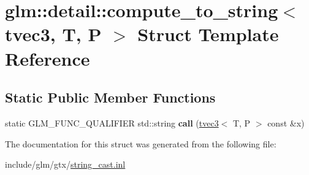 \hypertarget{structglm_1_1detail_1_1compute__to__string_3_01tvec3_00_01T_00_01P_01_4}{}\section{glm\+:\+:detail\+:\+:compute\+\_\+to\+\_\+string$<$ tvec3, T, P $>$ Struct Template Reference}
\label{structglm_1_1detail_1_1compute__to__string_3_01tvec3_00_01T_00_01P_01_4}
\subsection*{Static Public Member Functions}
\begin{DoxyCompactItemize}
\item 
\mbox{\label{structglm_1_1detail_1_1compute__to__string_3_01tvec3_00_01T_00_01P_01_4_acf3706c18e3084b171b0bcfe4ea64ffa}} 
static G\+L\+M\+\_\+\+F\+U\+N\+C\+\_\+\+Q\+U\+A\+L\+I\+F\+I\+ER std\+::string {\bfseries call} (\hyperlink{structglm_1_1tvec3}{tvec3}$<$ T, P $>$ const \&x)
\end{DoxyCompactItemize}


The documentation for this struct was generated from the following file\+:\begin{DoxyCompactItemize}
\item 
include/glm/gtx/\hyperlink{string__cast_8inl}{string\+\_\+cast.\+inl}\end{DoxyCompactItemize}
